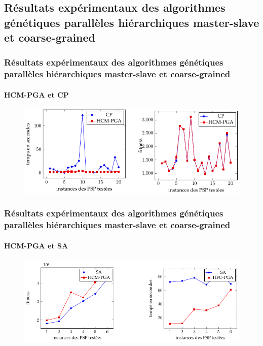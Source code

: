 \documentclass[11pt]{beamer}
\begin{document}
 \subsection{Résultats expérimentaux des algorithmes génétiques parallèles hiérarchiques master-slave et coarse-grained}
 
 \begin{frame}
 \frametitle{Résultats expérimentaux des algorithmes génétiques parallèles hiérarchiques master-slave et coarse-grained}
 \framesubtitle{HCM-PGA et CP}
 \begin{figure}[!h]
		\begin{center}
			\includegraphics[scale=.4
			]{img/cp_hcm.png}
		\end{center}
 \end{figure}
 \end{frame}
 
 \begin{frame}
 \frametitle{Résultats expérimentaux des algorithmes génétiques parallèles hiérarchiques master-slave et coarse-grained}
 \framesubtitle{HCM-PGA et SA}
 \begin{figure}[!h]
		\begin{center}
			\includegraphics[scale=.4
			]{img/sa_hcm.png}
		\end{center}
 \end{figure}
 \end{frame}
\end{document}
